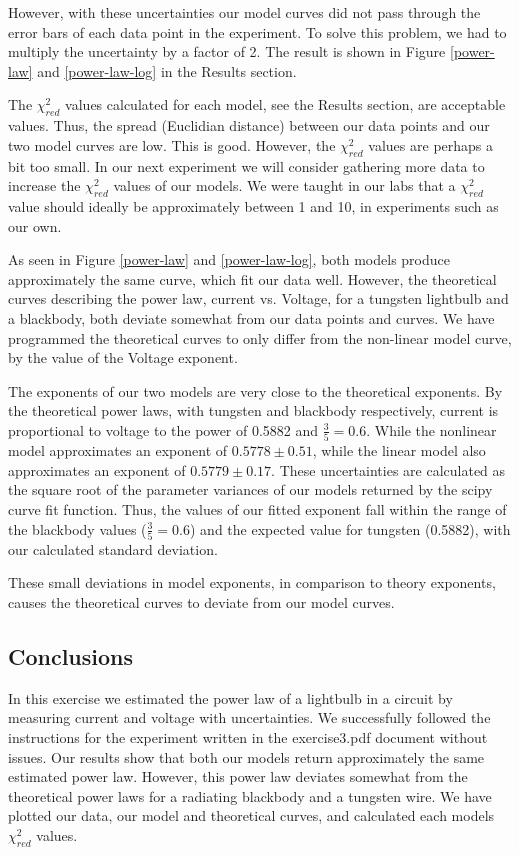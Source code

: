\documentclass[letterpaper,12pt]{article}
\begin{document}
However, with these uncertainties our model curves did not pass through 
the error bars of each data point in the experiment. To solve this problem, 
we had to multiply the uncertainty by a factor of 2. The result is shown in 
Figure \ref{power-law} and \ref{power-law-log} in the Results section.

The $\chi^2_{red}$ values calculated for each model, see the Results section, are acceptable values. Thus, the spread (Euclidian distance) between our data points and our two model curves are low. This is good. However, the $\chi^2_{red}$ values are perhaps a bit too small. In our next experiment we will consider gathering more data to increase the $\chi^2_{red}$ values of our models. We were taught in our labs that a $\chi^2_{red}$ value should ideally be approximately between 1 and 10, in experiments such as our own.

As seen in Figure \ref{power-law} and \ref{power-law-log}, both models produce approximately the same curve, which fit our data well. However, the theoretical curves describing the power law, current vs. Voltage, for a tungsten lightbulb and a blackbody, both deviate somewhat from our data points and curves. We have programmed the theoretical curves to only differ from the non-linear model curve, by the value of the Voltage exponent.

The exponents of our two models are very close to the theoretical exponents. 
By the theoretical power laws, with tungsten and blackbody respectively, 
current is proportional to voltage to the power of 0.5882 and $\frac{3}{5} = 0.6$. 
While the nonlinear model approximates an exponent of $0.5778 \pm 0.51$,
while the linear model also approximates an exponent of $0.5779 \pm 0.17$. 
These uncertainties are calculated as the square root of the parameter 
variances of our models returned by the scipy curve fit function. 
Thus, the values of our fitted exponent fall within the range of the blackbody 
values ($\frac{3}{5}=0.6$) and the expected value for tungsten (0.5882), 
with our calculated standard deviation.

These small deviations in model exponents, in comparison to theory exponents, 
causes the theoretical curves to deviate from our model curves.

\subsection{Conclusions}

In this exercise we estimated the power law of a lightbulb in a circuit by measuring current and voltage with uncertainties. We successfully followed the instructions for the experiment written in the exercise3.pdf document without issues. Our results show that both our models return approximately the same estimated power law. However, this power law deviates somewhat from the theoretical power laws for a radiating blackbody and a tungsten wire. We have plotted our data, our model and theoretical curves, and calculated each models $\chi^2_{red}$ values. 
\end{document}
